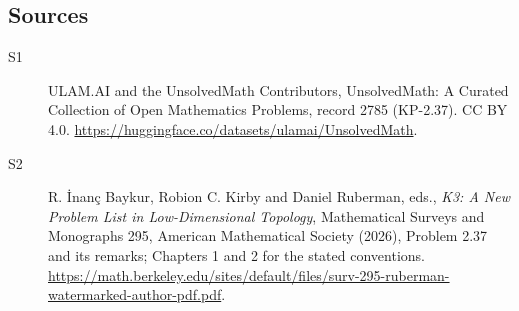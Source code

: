 \documentclass[11pt]{article}
\begin{document}
\subsection{Sources}
\begin{description}
\item[\hypertarget{source:2785:1}{S1}] ULAM.AI and the UnsolvedMath Contributors, UnsolvedMath: A Curated Collection of Open Mathematics Problems, record 2785 (KP-2.37). CC BY 4.0. \url{https://huggingface.co/datasets/ulamai/UnsolvedMath}.
\item[\hypertarget{source:2785:2}{S2}] R. İnanç Baykur, Robion C. Kirby and Daniel Ruberman, eds., \emph{K3: A New Problem List in Low-Dimensional Topology}, Mathematical Surveys and Monographs 295, American Mathematical Society (2026), Problem 2.37 and its remarks; Chapters 1 and 2 for the stated conventions. \url{https://math.berkeley.edu/sites/default/files/surv-295-ruberman-watermarked-author-pdf.pdf}.
\end{description}
\label{end:2785}
\end{document}
